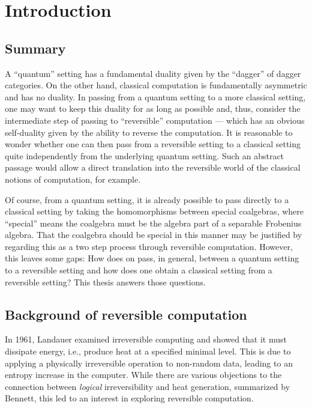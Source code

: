 \chapter{Introduction}\label{chap:introduction}
\section{Summary}\label{sec:summary}
A ``quantum'' setting has a fundamental duality given by the ``dagger'' of dagger
categories\cite{selinger05:dagger,abramsky05:abstractscalars}. On the other hand, classical
computation is fundamentally asymmetric and has no duality. In passing from a quantum setting to a more classical setting, one
may want to keep this duality for as long as possible and, thus, consider the intermediate step of
passing to ``reversible'' computation --- which has an obvious self-duality given by the ability to
reverse the computation. It is reasonable to
wonder whether one can then pass from a reversible setting to a classical setting quite
independently from the underlying quantum setting. Such an abstract
passage would allow a direct translation into the reversible world of the classical notions of
computation, for example.

Of course, from a quantum setting, it is already possible to pass directly to a classical setting by
taking the homomorphisms between special coalgebras, where ``special'' means the coalgebra must be
the algebra part of a separable Frobenius algebra. That the coalgebra should be special in this manner
may be justified by regarding this as a two step process through reversible computation. However,
this leaves some gaps: How does on pass, in general, between a quantum setting to a reversible
setting and how does one obtain a classical setting from a reversible setting? This thesis answers
those questions.
\section{Background of reversible computation}
\label{sec:background}

In 1961, Landauer\cite{landauer1961irreversibility} examined irreversible computing
and showed that it must dissipate energy, i.e., produce heat at a specified minimal level. This is
due to applying a physically irreversible operation to non-random data, leading to an entropy
increase in the computer. While there are various objections to the connection between
\emph{logical} irreversibility and heat generation, summarized by Bennett\cite{bennett2003notes},
this led to an interest in exploring reversible computation.

